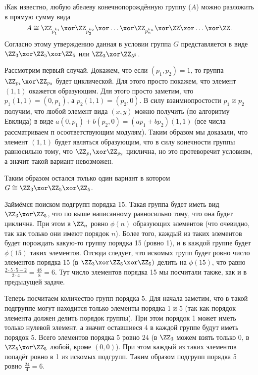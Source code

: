 \i Как известно, любую абелеву конечнопорождённую группу ($A$) можно разложить в прямую сумму вида 
$$A \cong \ZZ_{p_1^{k_1}} \xor \ZZ_{p_2^{k_2}} \xor \ldots \xor \ZZ_{p_n^{k_n}} \xor \ZZ \xor \ldots \xor \ZZ.$$
Согласно этому утверждению данная в условии группа $G$ представляется в виде $\ZZ_3 \xor \ZZ_5 \xor \ZZ_5$ или $\ZZ_3 \xor \ZZ_{5^2}$.
\par Рассмотрим первый случай. Докажем, что если $(p_1, p_2) = 1$, то группа $\ZZ_{p_1} \xor \ZZ_{p_2}$ будет циклической. Для этого просто покажем, что элемент $(1, 1)$ окажется образующим. Для этого просто заметим, что $p_1(1, 1) = (0, p_1)$, а $p_2(1, 1) = (p_2, 0)$. В силу взаимнопростости $p_1$ и $p_2$ получим, что любой элемент вида $(x, y)$ можно получить (по алгоритму Евклида) в виде $a(0, p_1) + b(p_2, 0) = (ap_1 + bp_2)(1, 1)$ (все числа рассматриваем п осоответствующим модулям). Таким образом мы доказали, что элемент $(1, 1)$ будет являться образующим, что в силу конечности группы равносильно тому, что $\ZZ_{p_1} \xor \ZZ_{p_2}$ циклична, но это протеворечит условиям, а значит такой вариант невозможен.
\par Таким образом остался только один вариант в котором $G \cong \ZZ_3 \xor \ZZ_5 \xor \ZZ_5$.
\par Займёмся поиском подгрупп порядка 15. Такая группа будет иметь вид $\ZZ_3 \xor \ZZ_5$, что по выше написанному равносильно тому, что она будет циклична. При этом в $\ZZ_n$ ровно $\phi(n)$ образующих элементов (что очевидно, так как только они имеют порядок $n$). Более того, каждый из таких элементов будет порождать какую-то группу порядка 15 (ровно 1), и в каждой группе будет $\phi(15)$ таких элементов. Отсюда следует, что искомых групп будет ровно число элементов порядка 15 (в $\ZZ_3 \xor \ZZ_5 \xor \ZZ_5)$ делить на $\phi(15)$, что равно $\frac{2 \cdot 5 \cdot 5 - 2}{2 \cdot 4} = \frac{48}{8} = 6.$ Тут число элементов порядка 15 мы посчитали также, как и в предыдущей задаче.
\par Теперь посчитаем количество групп порядка 5. Для начала заметим, что в такой подгруппе могут находится только элементы порядка 1 и 5 (так как порядок элемента должен делить порядок группы). При этом порядок 1 может иметь только нулевой элемент, а значит оставшиеся 4 в каждой группе будут иметь порядок 5. Всего элементов порядка 5 ровно 24 (в $\ZZ_3$ можем взять только 0, в $\ZZ_5 \xor \ZZ_5$ любой, кроме $(0, 0)$). При этом каждый из таких элементов попадёт ровно в 1 из искомых подгрупп. Таким образом подгрупп порядка 5 ровно $\frac{24}{4} = 6$.


